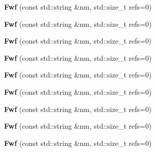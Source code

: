 \begin{DoxyCompactItemize}
{\bfseries Fwf} (const std\+::string \&nm, std\+::size\+\_\+t refs=0)
\item 
\mbox{\label{class_fwf_a1500e0ece206c25d97026b41b0363508}} 
{\bfseries Fwf} (const std\+::string \&nm, std\+::size\+\_\+t refs=0)
\item 
\mbox{\label{class_fwf_a1500e0ece206c25d97026b41b0363508}} 
{\bfseries Fwf} (const std\+::string \&nm, std\+::size\+\_\+t refs=0)
\item 
\mbox{\label{class_fwf_a1500e0ece206c25d97026b41b0363508}} 
{\bfseries Fwf} (const std\+::string \&nm, std\+::size\+\_\+t refs=0)
\item 
\mbox{\label{class_fwf_a1500e0ece206c25d97026b41b0363508}} 
{\bfseries Fwf} (const std\+::string \&nm, std\+::size\+\_\+t refs=0)
\item 
\mbox{\label{class_fwf_a1500e0ece206c25d97026b41b0363508}} 
{\bfseries Fwf} (const std\+::string \&nm, std\+::size\+\_\+t refs=0)
\item 
\mbox{\label{class_fwf_a1500e0ece206c25d97026b41b0363508}} 
{\bfseries Fwf} (const std\+::string \&nm, std\+::size\+\_\+t refs=0)
\item 
\mbox{\label{class_fwf_a1500e0ece206c25d97026b41b0363508}} 
{\bfseries Fwf} (const std\+::string \&nm, std\+::size\+\_\+t refs=0)
\item 
\mbox{\label{class_fwf_a1500e0ece206c25d97026b41b0363508}} 
{\bfseries Fwf} (const std\+::string \&nm, std\+::size\+\_\+t refs=0)
\end{DoxyCompactItemize}


